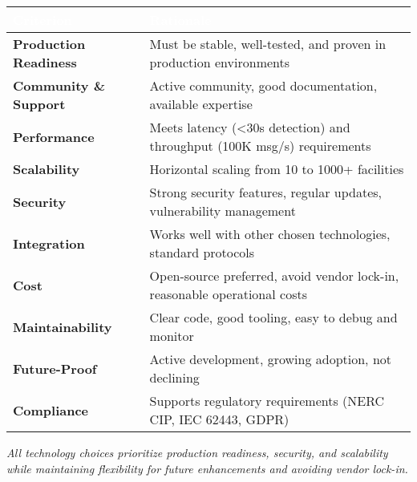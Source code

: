 \documentclass[12pt,a4paper,landscape]{article}
\begin{document}
\begin{center}
\begin{tabular}{|p{4cm}|p{12cm}|}
\hline
\rowcolor{headercolor}
\textcolor{white}{\textbf{Criterion}} & 
\textcolor{white}{\textbf{Rationale}} \\
\hline
\textbf{Production Readiness} & Must be stable, well-tested, and proven in production environments \\
\hline
\textbf{Community \& Support} & Active community, good documentation, available expertise \\
\hline
\textbf{Performance} & Meets latency (<30s detection) and throughput (100K msg/s) requirements \\
\hline
\textbf{Scalability} & Horizontal scaling from 10 to 1000+ facilities \\
\hline
\textbf{Security} & Strong security features, regular updates, vulnerability management \\
\hline
\textbf{Integration} & Works well with other chosen technologies, standard protocols \\
\hline
\textbf{Cost} & Open-source preferred, avoid vendor lock-in, reasonable operational costs \\
\hline
\textbf{Maintainability} & Clear code, good tooling, easy to debug and monitor \\
\hline
\textbf{Future-Proof} & Active development, growing adoption, not declining \\
\hline
\textbf{Compliance} & Supports regulatory requirements (NERC CIP, IEC 62443, GDPR) \\
\hline
\end{tabular}
\end{center}

\vspace{1cm}

\begin{center}
\textit{All technology choices prioritize production readiness, security, and scalability\\
while maintaining flexibility for future enhancements and avoiding vendor lock-in.}
\end{center}
\end{document}
